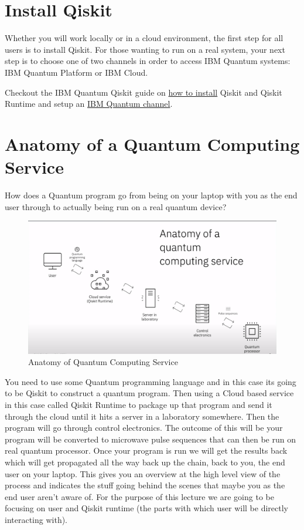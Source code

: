 \documentclass[12pt, oneside]{book}
\theoremstyle{definition}
\theoremstyle{definition}
\theoremstyle{remark}
\begin{document}
\section{Install Qiskit}
Whether you will work locally or in a cloud environment, the first step for all users is to install Qiskit. For those wanting to run on a real system, your next step is to choose one of two channels in order to access IBM Quantum systems: IBM Quantum Platform or IBM Cloud.

Checkout the IBM Quantum Qiskit guide on \href{https://docs.quantum.ibm.com/guides/install-qiskit}{how to install} Qiskit and Qiskit Runtime and setup an \href{https://docs.quantum.ibm.com/guides/setup-channel}{IBM Quantum channel}.

\section{Anatomy of a Quantum Computing Service}
How does a Quantum program go from being on your laptop with you as the end user through to actually being run on a real quantum device?
\begin{figure}
    \centering
    \includegraphics[width=0.75\linewidth]{../images/AnatomyofQC.png}
    \caption{Anatomy of Quantum Computing Service}
    \label{fig:AnatomyofQC}
\end{figure}
You need to use some Quantum programming language and in this case its going to be Qiskit to construct a quantum program. Then using a Cloud based service in this case called Qiskit Runtime to package up that program and send it through the cloud until it hits a server in a laboratory somewhere. Then the program will go through control electronics. The outcome of this will be your program will be converted to microwave pulse sequences that can then be run on real quantum processor. Once your program is run we will get the results back which will get propagated all the way back up the chain, back to you, the end user on your laptop. This gives you an overview at the high level view of the process and indicates the stuff going behind the scenes that maybe you as the end user aren't aware of. For the purpose of this lecture we are going to be focusing on user and Qiskit runtime (the parts with which user will be directly interacting with).
\end{document}
